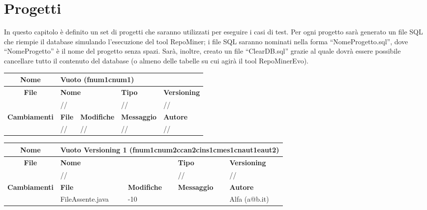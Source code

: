 \chapter{Progetti}
In questo capitolo è definito un set di progetti che saranno utilizzati per eseguire i casi di test. Per ogni progetto sarà generato un file SQL che riempie il database simulando l'esecuzione del tool RepoMiner; i file SQL saranno nominati nella forma ``NomeProgetto.sql'', dove ``NomeProgetto'' è il nome del progetto senza spazi. Sarà, inoltre, creato un file ``ClearDB.sql'' grazie al quale dovrà essere possibile cancellare tutto il contenuto del database (o almeno delle tabelle su cui agirà il tool RepoMinerEvo).

\begin{table}[ht]
\footnotesize
\begin{tabular}{|c|p{2.5cm}|p{2cm}|p{2.5cm}|p{2.5cm}|}
  \hline
  \textbf{Nome}	& \multicolumn{4}{l|}{Vuoto (fnum1cnum1)} 												\\
  \hline
  \rowcolor{lightgray}\textbf{File} 		& \multicolumn{2}{l|}{\textbf{Nome}}		& \textbf{Tipo}		& \textbf{Versioning} 		\\
						\cline{2-5}
						& \multicolumn{2}{l|}{//}			& //			& //				\\
  \hline
  \rowcolor{lightgray}\textbf{Cambiamenti}	& \textbf{File}		&\textbf{Modifiche}	& \textbf{Messaggio}	& \textbf{Autore}		\\
						\cline{2-5}
						& //			& //  			& //			& //				\\
  \hline
\end{tabular}
\end{table}

\begin{table}[ht]
\footnotesize
\begin{tabular}{|c|p{2.5cm}|p{2cm}|p{2.5cm}|p{2.5cm}|}
  \hline
  \textbf{Nome}	& \multicolumn{4}{l|}{Vuoto Versioning 1 (fnum1cnum2ccan2cins1cmes1cnaut1eaut2)} 							\\
  \hline
  \rowcolor{lightgray}\textbf{File} 		& \multicolumn{2}{l|}{\textbf{Nome}}		& \textbf{Tipo}		& \textbf{Versioning} 		\\
						\cline{2-5}
						& \multicolumn{2}{l|}{//}			& //			& //				\\
  \hline
  \rowcolor{lightgray}\textbf{Cambiamenti}	& \textbf{File}		&\textbf{Modifiche}	& \textbf{Messaggio}	& \textbf{Autore}		\\
						\cline{2-5}
						& FileAssente.java	& -10	  		& 			& Alfa (a@b.it)			\\
  \hline
\end{tabular}
\end{table}

